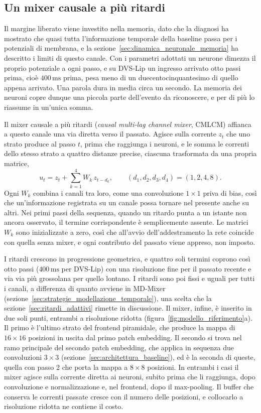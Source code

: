 \subsection{Un mixer causale a più ritardi}
\label{subsec:mixer_ritardi}

Il margine liberato viene investito nella memoria, dato che la diagnosi ha mostrato che quasi tutta l'informazione temporale della baseline passa per i potenziali di membrana, e la sezione~\ref{sec:dinamica_neuronale_memoria} ha descritto i limiti di questo canale. Con i parametri adottati un neurone dimezza il proprio potenziale a ogni passo, e su DVS-Lip un ingresso arrivato otto passi prima, cioè $400\,\mathrm{ms}$ prima, pesa meno di un duecentocinquantesimo di quello appena arrivato. Una parola dura in media circa un secondo. La memoria dei neuroni copre dunque una piccola parte dell'evento da riconoscere, e per di più lo riassume in un'unica somma.

Il mixer causale a più ritardi (\emph{causal multi-lag channel mixer}, CMLCM) affianca a questo canale una via diretta verso il passato. Agisce sulla corrente $z_t$ che uno strato produce al passo $t$, prima che raggiunga i neuroni, e le somma le correnti dello stesso strato a quattro distanze precise, ciascuna trasformata da una propria matrice,
\begin{equation}
\label{eq:cmlcm}
u_t=z_t+\sum_{k=1}^{4}W_k\,z_{t-d_k},
\qquad
(d_1,d_2,d_3,d_4)=(1,2,4,8).
\end{equation}
Ogni $W_k$ combina i canali tra loro, come una convoluzione $1\times1$ priva di bias, così che un'informazione registrata su un canale possa tornare nel presente anche su altri. Nei primi passi della sequenza, quando un ritardo punta a un istante non ancora osservato, il termine corrispondente è semplicemente assente. Le matrici $W_k$ sono inizializzate a zero, così che all'avvio dell'addestramento la rete coincide con quella senza mixer, e ogni contributo del passato viene appreso, non imposto.

I ritardi crescono in progressione geometrica, e quattro soli termini coprono così otto passi ($400\,\mathrm{ms}$ per DVS-Lip) con una risoluzione fine per il passato recente e via via più grossolana per quello lontano. I ritardi sono poi fissi e uguali per tutti i canali, a differenza di quanto avviene in MD-Mixer (sezione~\ref{sec:strategie_modellazione_temporale}), una scelta che la sezione~\ref{sec:ritardi_adattivi} rimette in discussione. Il mixer, infine, è inserito in due soli punti, entrambi a risoluzione ridotta (figura~\ref{fig:modello_riferimento}a). Il primo è l'ultimo strato del frontend piramidale, che produce la mappa di $16\times16$ posizioni in uscita dal primo patch embedding. Il secondo si trova nel ramo principale del secondo patch embedding, che applica in sequenza due convoluzioni $3\times3$ (sezione~\ref{sec:architettura_baseline}), ed è la seconda di queste, quella con passo 2 che porta la mappa a $8\times8$ posizioni. In entrambi i casi il mixer agisce sulla corrente diretta ai neuroni, subito prima che li raggiunga, dopo convoluzione e normalizzazione e, nel frontend, dopo il max-pooling. Il buffer che conserva le correnti passate cresce con il numero delle posizioni, e collocarlo a risoluzione ridotta ne contiene il costo.

